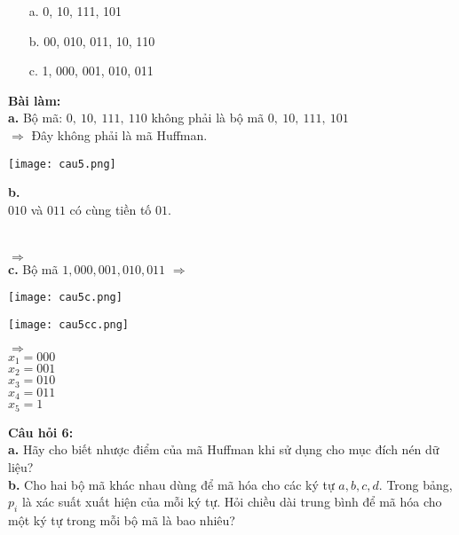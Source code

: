 \documentclass[12pt]{article}
\begin{document}
\begin{enumerate}
    \item[a.] 0, 10, 111, 101
    \item[b.] 00, 010, 011, 10, 110
    \item[c.] 1, 000, 001, 010, 011
\end{enumerate}
\textbf{Bài làm:}
\\
\textbf{a.} Bộ mã: $0,\ 10,\ 111,\ 110$ không phải là bộ mã $0,\ 10,\ 111,\ 101$ \\
$\Rightarrow$ Đây không phải là mã Huffman.
\begin{center}
    \begin{center}
    \texttt{[image: cau5.png]}
\end{center}

\end{center}
\textbf{b.}
\\ $010$ và $011$ có cùng tiền tố $01$.
\\ 
\\ 
\\
$\Rightarrow$ 
\\
\textbf{c.}  Bộ mã $1, 000, 001, 010, 011$ $\Rightarrow$ 
\begin{center}
    \texttt{[image: cau5c.png]}
\end{center}
\begin{flushleft}
    \texttt{[image: cau5cc.png]}
\end{flushleft}

    $\Rightarrow$ \\
    $x_1 = 000$\\
    $x_2 = 001$\\
    $x_3 = 010$\\
    $x_4 = 011$\\
    $x_5 = 1$
    
\newpage
\textbf{Câu hỏi 6:} \\

\textbf{a.} Hãy cho biết nhược điểm của mã Huffman khi sử dụng cho mục đích nén dữ liệu? \\

\textbf{b.} Cho hai bộ mã khác nhau dùng để mã hóa cho các ký tự $a, b, c, d$. Trong bảng, $p_i$ là xác suất xuất hiện của mỗi ký tự. Hỏi chiều dài trung bình để mã hóa cho một ký tự trong mỗi bộ mã là bao nhiêu?
\end{document}
